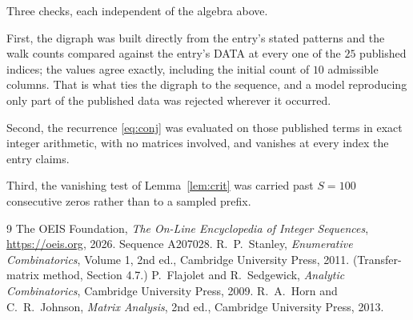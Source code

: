 \documentclass[11pt,a4paper]{article}
\theoremstyle{plain}
\theoremstyle{definition}
\begin{document}
Three checks, each independent of the algebra above.

First, the digraph was built directly from the entry's stated patterns and the walk counts
compared against the entry's DATA at every one of the $25$ published indices; the
values agree exactly, including the initial count of $10$ admissible columns. That is
what ties the digraph to the sequence, and a model reproducing only part of the published
data was rejected wherever it occurred.

Second, the recurrence \eqref{eq:conj} was evaluated on those published terms in exact
integer arithmetic, with no matrices involved, and vanishes at every index the entry claims.

Third, the vanishing test of Lemma~\ref{lem:crit} was carried past $S=100$ consecutive
zeros rather than to a sampled prefix.

\begin{thebibliography}{9}
 The OEIS Foundation, \emph{The On-Line Encyclopedia of Integer
Sequences}, \url{https://oeis.org}, 2026. Sequence A207028.
 R.~P.~Stanley, \emph{Enumerative Combinatorics}, Volume 1, 2nd ed.,
Cambridge University Press, 2011. (Transfer-matrix method, Section 4.7.)
 P.~Flajolet and R.~Sedgewick, \emph{Analytic Combinatorics}, Cambridge
University Press, 2009.
 R.~A.~Horn and C.~R.~Johnson, \emph{Matrix Analysis}, 2nd ed., Cambridge
University Press, 2013.
\end{thebibliography}
\end{document}
